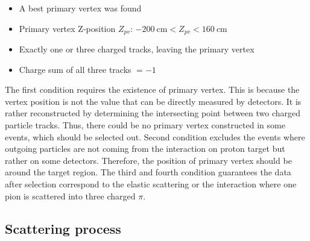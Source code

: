 \begin{itemize}
	\item A best primary vertex was found
	\item Primary vertex Z-position $Z_{pv}$: $\SI{-200}{\centi\meter} < Z_{pv} < \SI{160}{\centi\meter}$
	\item Exactly one or three charged tracks, leaving the primary vertex
	\item Charge sum of all three tracks $= -1$
\end{itemize}
The first condition requires the existence of primary vertex. This is because the vertex position is not the value that can be directly measured by detectors. It is rather reconstructed by determining the intersecting point between two charged particle tracks. Thus, there could be no primary vertex constructed in some events, which should be selected out. Second condition excludes the events where outgoing particles are not coming from the interaction on proton target but rather on some detectors. Therefore, the position of primary vertex should be around the target region. The third and fourth condition guarantees the data after selection correspond to the elastic scattering or the interaction where one pion is scattered into three charged $\pi$.   


\subsection{Scattering process}

\clearpage